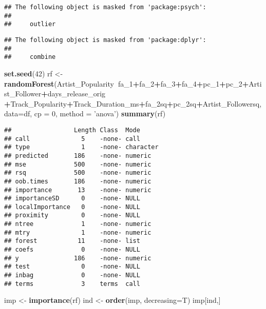 \documentclass[
]{article}
\newenvironment{Shaded}{\begin{snugshade}}{\end{snugshade}}
\newcommand{\DataTypeTok}[1]{\textcolor[rgb]{0.13,0.29,0.53}{#1}}
\newcommand{\DecValTok}[1]{\textcolor[rgb]{0.00,0.00,0.81}{#1}}
\newcommand{\KeywordTok}[1]{\textcolor[rgb]{0.13,0.29,0.53}{\textbf{#1}}}
\newcommand{\NormalTok}[1]{#1}
\newcommand{\OperatorTok}[1]{\textcolor[rgb]{0.81,0.36,0.00}{\textbf{#1}}}
\newcommand{\StringTok}[1]{\textcolor[rgb]{0.31,0.60,0.02}{#1}}
\begin{document}
\begin{verbatim}
## The following object is masked from 'package:psych':
## 
##     outlier
\end{verbatim}

\begin{verbatim}
## The following object is masked from 'package:dplyr':
## 
##     combine
\end{verbatim}

\begin{Shaded}
\begin{Highlighting}[]
\KeywordTok{set.seed}\NormalTok{(}\DecValTok{42}\NormalTok{)}
\NormalTok{rf <-}\KeywordTok{randomForest}\NormalTok{(Artist_Popularity}\OperatorTok{~}\NormalTok{fa_}\DecValTok{1}\OperatorTok{+}\NormalTok{fa_}\DecValTok{2}\OperatorTok{+}\NormalTok{fa_}\DecValTok{3}\OperatorTok{+}\NormalTok{fa_}\DecValTok{4}\OperatorTok{+}\NormalTok{pc_}\DecValTok{1}\OperatorTok{+}\NormalTok{pc_}\DecValTok{2}\OperatorTok{+}\NormalTok{Artist_Follower}\OperatorTok{+}\NormalTok{days_release_orig}
                  \OperatorTok{+}\NormalTok{Track_Popularity}\OperatorTok{+}\NormalTok{Track_Duration_ms}\OperatorTok{+}\NormalTok{fa_2sq}\OperatorTok{+}\NormalTok{pc_2sq}\OperatorTok{+}\NormalTok{Artist_Followersq, }\DataTypeTok{data=}\NormalTok{df, }\DataTypeTok{cp =} \DecValTok{0}\NormalTok{, }\DataTypeTok{method =} \StringTok{'anova'}\NormalTok{)}
\KeywordTok{summary}\NormalTok{(rf)}
\end{Highlighting}
\end{Shaded}

\begin{verbatim}
##                 Length Class  Mode     
## call              5    -none- call     
## type              1    -none- character
## predicted       186    -none- numeric  
## mse             500    -none- numeric  
## rsq             500    -none- numeric  
## oob.times       186    -none- numeric  
## importance       13    -none- numeric  
## importanceSD      0    -none- NULL     
## localImportance   0    -none- NULL     
## proximity         0    -none- NULL     
## ntree             1    -none- numeric  
## mtry              1    -none- numeric  
## forest           11    -none- list     
## coefs             0    -none- NULL     
## y               186    -none- numeric  
## test              0    -none- NULL     
## inbag             0    -none- NULL     
## terms             3    terms  call
\end{verbatim}

\begin{Shaded}
\begin{Highlighting}[]
\NormalTok{imp <-}\StringTok{ }\KeywordTok{importance}\NormalTok{(rf)}
\NormalTok{ind <-}\StringTok{ }\KeywordTok{order}\NormalTok{(imp, }\DataTypeTok{decreasing=}\NormalTok{T)}
\NormalTok{imp[ind,]}
\end{Highlighting}
\end{Shaded}
\end{document}
